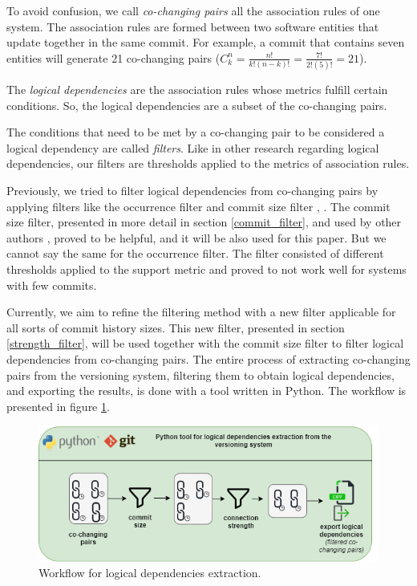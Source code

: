 \documentclass[runningheads]{comsis2}
\newcommand*{\Comb}[2]{{}C^{#1}_{#2}}%
\begin{document}
To avoid confusion, we call \textit{co-changing pairs} all the association rules of one system. The association rules are formed between two software entities that update together in the same commit.
For example, a commit that contains seven entities will generate 21 co-changing pairs ($\Comb{n}{k}=\frac{n!}{k!(n-k)!} = \frac{7!}{2!(5)!} = 21$).


The \textit{logical dependencies} are the association rules whose metrics fulfill certain conditions. So, the logical dependencies are a subset of the co-changing pairs. 

The conditions that need to be met by a co-changing pair to be considered a logical dependency are called \textit{filters}. Like in other research regarding logical dependencies, our filters are thresholds applied to the metrics of association rules. 

Previously, we tried to filter logical dependencies from co-changing pairs by applying filters like the occurrence filter and commit size filter \cite{saci19}, \cite{enase19}. 
The commit size filter, presented in more detail in section \ref{commit_filter}, and used by other authors \cite{DBLP:journals/jss/AjienkaC17}, proved to be helpful, and it will be also used for this paper. 
But we cannot say the same for the occurrence filter. The filter consisted of different thresholds applied to the support metric and proved to not work well for systems with few commits.

Currently, we aim to refine the filtering method with a new filter applicable for all sorts of commit history sizes. This new filter, presented in section \ref{strength_filter}, will be used together with the commit size filter to filter logical dependencies from co-changing pairs. The entire process of extracting co-changing pairs from the versioning system, filtering them to obtain logical dependencies, and exporting the results, is done with a tool written in Python. The workflow is presented in figure \ref{fig:workflow_key}.

\begin{figure}
\centering
\includegraphics[scale=0.7]{ld_workflow.png}
\caption{Workflow for logical dependencies extraction.}
\label{fig:workflow_key}
\centering
\end{figure}
\end{document}
